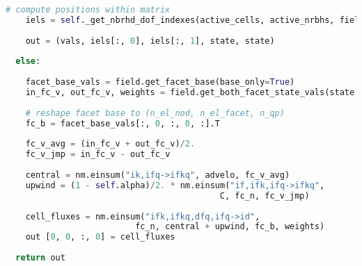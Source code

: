 \begin{lstlisting}[language=Python, caption=Computation of advection cell
fluxes. \label{lst:adv_flux}]
    # compute positions within matrix
    iels = self._get_nbrhd_dof_indexes(active_cells, active_nrbhs, field)
    
    out = (vals, iels[:, 0], iels[:, 1], state, state)
    
  else:
  
    facet_base_vals = field.get_facet_base(base_only=True)
    in_fc_v, out_fc_v, weights = field.get_both_facet_state_vals(state, region)
    
    # reshape facet base to (n_el_nod, n_el_facet, n_qp)
    fc_b = facet_base_vals[:, 0, :, 0, :].T
    
    fc_v_avg = (in_fc_v + out_fc_v)/2.
    fc_v_jmp = in_fc_v - out_fc_v
    
    central = nm.einsum("ik,ifq->ifkq", advelo, fc_v_avg) 
    upwind = (1 - self.alpha)/2. * nm.einsum("if,ifk,ifq->ifkq",
                                           C, fc_n, fc_v_jmp)
    
    cell_fluxes = nm.einsum("ifk,ifkq,dfq,ifq->id",
                          fc_n, central + upwind, fc_b, weights)
    out [0, 0, :, 0] = cell_fluxes
  
  return out
\end{lstlisting}
